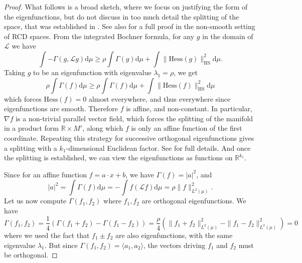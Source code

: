 \documentclass[10pt,reqno]{amsart}
\numberwithin{equation}{section}
\begin{document}
\begin{proof}
  What follows is a broad sketch, where we focus on justifying the form of the
  eigenfunctions, but do not discuss in too much detail the splitting of the
  space, that was established in \cite{CZ17}. See also \cite{GKKO20} for a
  full proof in the non-smooth setting of RCD spaces. From the integrated
  Bochner formula, for any $g$ in the domain of $\mathcal{L}$ we have
  \begin{equation}
    \int-\Gamma(g,\mathcal{L} g)\mathrm{d}\mu 
    \geq \rho \int\Gamma(g)\mathrm{d}\mu + \int\|\mathrm{Hess}(g)\|_{\mathrm{HS}}^2\mathrm{d}\mu.
  \end{equation}
  Taking $g$ to be an eigenfunction with eigenvalue $\lambda_1 = \rho$, we get
  \begin{equation}
    \rho \int\Gamma(f)\mathrm{d}\mu
    \geq \rho \int\Gamma(f)\mathrm{d}\mu + \int\|\mathrm{Hess}(f)\|_{\mathrm{HS}}^2\mathrm{d}\mu
  \end{equation}
  which forces $\mathrm{Hess}(f) = 0$ almost everywhere, and thus everywhere
  since eigenfunctions are smooth. Therefore $f$ is affine, and non-constant.
  In particular, $\nabla f$ is a non-trivial parallel vector field, which
  forces the splitting of the manifold in a product form $\mathbb{R} \times M'$, along
  which $f$ is only an affine function of the first coordinate. Repeating this
  strategy for successive orthogonal eigenfunctions gives a splitting with a
  $k_1$-dimensional Euclidean factor. See \cite{CZ17} for full details. And once
  the splitting is established, we can view the eigenfunctions as functions on
  $\mathbb{R}^{k_1}$.

  Since for an affine function $f = a\cdot x + b$, we have $\Gamma(f) = |a|^2$, and
  \begin{equation}
    |a|^2 =\int\Gamma(f)\mathrm{d}\mu = -\int f(\mathcal{L} f)\mathrm{d}\mu = \rho\|f\|_{L^2(\mu)}^2.
  \end{equation}
  Let us now compute $\Gamma(f_1, f_2)$ where $f_1, f_2$ are orthogonal
  eigenfunctions. We have
  \begin{equation}
    \Gamma(f_1, f_2) = \frac{1}{4}(\Gamma(f_1 + f_2) - \Gamma(f_1-f_2)) 
                     = \frac{\rho}{4}(\|f_1 + f_2\|_{L^2(\mu)}^2 - \|f_1 - f_2\|_{L^2(\mu)}^2) 
                     = 0
  \end{equation}
  where we used the fact that $f_1 \pm f_2$ are also eigenfunctions, with the
  same eigenvalue $\lambda_1$. But since
  $\Gamma(f_1, f_2) = \langle a_1, a_2\rangle$, the vectors driving $f_1$ and
  $f_2$ must be orthogonal.
\end{proof}
\end{document}
